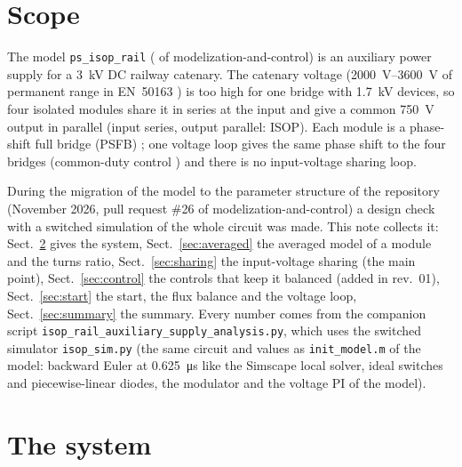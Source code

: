 \documentclass[10pt,a4paper]{scrartcl}
\newcommand{\code}[1]{\texttt{#1}}
\begin{document}

\tableofcontents
\newpage
\begin{onehalfspace}

\section{Scope}
\label{sec:scope}

The model \code{ps\_isop\_rail} ( of modelization-and-control) is an auxiliary power supply for a \SI{3}{kV} DC railway catenary. The catenary voltage (\SIrange{2000}{3600}{V} of permanent range in EN~50163 \cite{en50163}) is too high for one bridge with \SI{1.7}{kV} devices, so four isolated modules share it in series at the input and give a common \SI{750}{V} output in parallel (input series, output parallel: ISOP). Each module is a phase-shift full bridge (PSFB) \cite{sabate1990}; one voltage loop gives the same phase shift to the four bridges (common-duty control \cite{giri2006}) and there is no input-voltage sharing loop.

During the migration of the model to the parameter structure of the repository (November 2026, pull request \#26 of modelization-and-control) a design check with a switched simulation of the whole circuit was made. This note collects it: Sect.~\ref{sec:system} gives the system, Sect.~\ref{sec:averaged} the averaged model of a module and the turns ratio, Sect.~\ref{sec:sharing} the input-voltage sharing (the main point), Sect.~\ref{sec:control} the controls that keep it balanced (added in rev.~01), Sect.~\ref{sec:start} the start, the flux balance and the voltage loop, Sect.~\ref{sec:summary} the summary. Every number comes from the companion script \code{isop\_rail\_auxiliary\_supply\_analysis.py}, which uses the switched simulator \code{isop\_sim.py} (the same circuit and values as \code{init\_model.m} of the model: backward Euler at \SI{0.625}{\micro s} like the Simscape local solver, ideal switches and piecewise-linear diodes, the modulator and the voltage PI of the model).

\section{The system}
\label{sec:system}


\end{onehalfspace}
\end{document}
